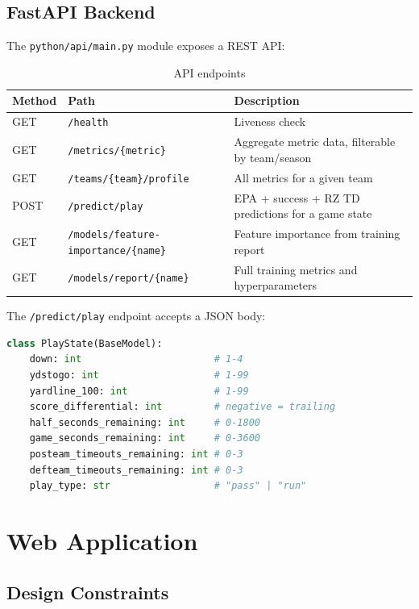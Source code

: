 \documentclass[11pt]{article}
\begin{document}
\subsection{FastAPI Backend}

The \texttt{python/api/main.py} module exposes a REST API:
\begin{table}[H]
\centering
\caption{API endpoints}
\begin{tabular}{lll}
\toprule
Method & Path & Description \\
\midrule
GET & \texttt{/health} & Liveness check \\
GET & \texttt{/metrics/\{metric\}} & Aggregate metric data, filterable by team/season \\
GET & \texttt{/teams/\{team\}/profile} & All metrics for a given team \\
POST & \texttt{/predict/play} & EPA + success + RZ TD predictions for a game state \\
GET & \texttt{/models/feature-importance/\{name\}} & Feature importance from training report \\
GET & \texttt{/models/report/\{name\}} & Full training metrics and hyperparameters \\
\bottomrule
\end{tabular}
\end{table}

The \texttt{/predict/play} endpoint accepts a JSON body:
\begin{lstlisting}[language=Python, caption={Play prediction request schema}]
class PlayState(BaseModel):
    down: int                       # 1-4
    ydstogo: int                    # 1-99
    yardline_100: int               # 1-99
    score_differential: int         # negative = trailing
    half_seconds_remaining: int     # 0-1800
    game_seconds_remaining: int     # 0-3600
    posteam_timeouts_remaining: int # 0-3
    defteam_timeouts_remaining: int # 0-3
    play_type: str                  # "pass" | "run"
\end{lstlisting}

\section{Web Application}
\label{sec:webapp}

\subsection{Design Constraints}
\end{document}
